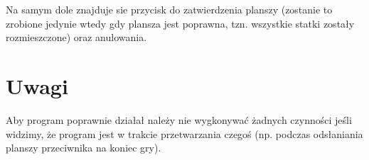 \documentclass[a4paper]{article}
\begin{document}
Na samym dole znajduje sie przycisk do zatwierdzenia planszy (zostanie to zrobione jedynie wtedy gdy plansza jest poprawna,
tzn. wszystkie statki zostały rozmieszczone) oraz anulowania.

\section{Uwagi}
Aby program poprawnie działał należy nie wygkonywać żadnych czynności jeśli widzimy, że program jest w trakcie przetwarzania czegoś
(np. podczas odsłaniania planszy przeciwnika na koniec gry).
\end{document}
